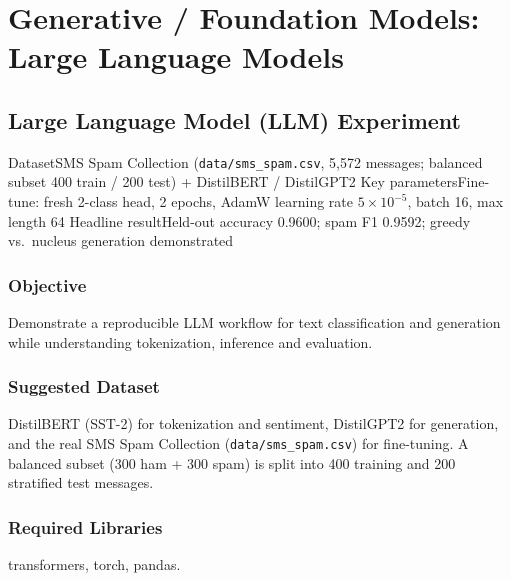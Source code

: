 
\part{Generative / Foundation Models: Large Language Models}

\chapter{Large Language Model (LLM) Experiment}\label{exp:18}


\quickfacts
  {Dataset}{SMS Spam Collection (\texttt{data/sms\_spam.csv}, 5,572 messages; balanced subset 400 train / 200 test) + DistilBERT / DistilGPT2}
  {Key parameters}{Fine-tune: fresh 2-class head, 2 epochs, AdamW learning rate $5\times10^{-5}$, batch 16, max length 64}
  {Headline result}{Held-out accuracy 0.9600; spam F1 0.9592; greedy vs.\ nucleus generation demonstrated}

\section{Objective}
Demonstrate a reproducible LLM workflow for text classification and generation while
understanding tokenization, inference and evaluation.

\section{Suggested Dataset}
DistilBERT (SST-2) for tokenization and sentiment, DistilGPT2 for generation, and the real
SMS Spam Collection (\texttt{data/sms\_spam.csv}) for fine-tuning. A balanced subset
(300 ham + 300 spam) is split into 400 training and 200 stratified test messages.

\section{Required Libraries}
transformers, torch, pandas.

